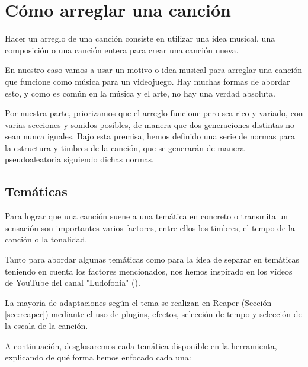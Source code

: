 \chapter{Cómo arreglar una canción}
\label{cap:comoArreglarCancion}
Hacer un arreglo de una canción consiste en utilizar una idea musical, una composición o una canción entera para crear una canción nueva.

En nuestro caso vamos a usar un motivo o idea musical para arreglar una canción que funcione como música para un videojuego. Hay muchas formas de abordar esto, y como es común en la música y el arte, no hay una verdad absoluta.

Por nuestra parte, priorizamos que el arreglo funcione pero sea rico y variado, con varias secciones y sonidos posibles, de manera que dos generaciones distintas no sean nunca iguales. Bajo esta premisa, hemos definido una serie de normas para la estructura y timbres de la canción, que se generarán de manera pseudoaleatoria siguiendo dichas normas.


\section{Temáticas}
\label{sec:tematicas}

Para lograr que una canción suene a una temática en concreto o transmita un sensación son importantes varios factores, entre ellos los timbres, el tempo de la canción o la tonalidad.

Tanto para abordar algunas temáticas como para la idea de separar en temáticas teniendo en cuenta los factores mencionados, nos hemos inspirado en los vídeos de YouTube  del canal "Ludofonia"  (\cite{LudofoniaDesierto}).

La mayoría de adaptaciones según el tema se realizan en Reaper (Sección \ref{sec:reaper}) mediante el uso de plugins, efectos, selección de tempo y selección de la escala de la canción.

A continuación, desglosaremos cada temática disponible en la herramienta, explicando de qué forma hemos enfocado cada una:

